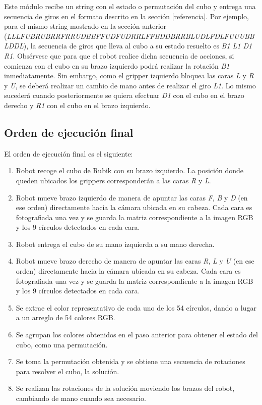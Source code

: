 Este módulo recibe un string con el estado o permutación del cubo y entrega una secuencia de giros en el formato descrito en la sección [referencia]. Por ejemplo, para el mismo string mostrado en la sección anterior (\textit{LLLFUBRUBRRFRRUDBBFFUDFUDRRLFFBDDBRRBLUDLFDLFUUUBBLDDL}), la secuencia de giros que lleva al cubo a su estado resuelto es \textit{B1 L1 D1 R1}. Obsérvese que para que el robot realice dicha secuencia de acciones, si comienza con el cubo en su brazo izquierdo podrá realizar la rotación \textit{B1} inmediatamente. Sin embargo, como el gripper izquierdo bloquea las caras \textit{L} y \textit{R} y \textit{U}, se deberá realizar un cambio de mano antes de realizar el giro \textit{L1}. Lo mismo sucederá cuando posteriormente se quiera efectuar \textit{D1} con el cubo en el brazo derecho y \textit{R1} con el cubo en el brazo izquierdo.


\subsection{Orden de ejecución final}
El orden de ejecución final es el siguiente:
\begin{enumerate}
	\item Robot recoge el cubo de Rubik con su brazo izquierdo. La posición donde queden ubicados los grippers corresponderán a las caras \textit{R} y \textit{L}.
	\item Robot mueve brazo izquierdo de manera de apuntar las caras \textit{F}, \textit{B} y \textit{D} (en ese orden) directamente hacia la cámara ubicada en su cabeza. Cada cara es fotografiada una vez y se guarda la matriz correspondiente a la imagen RGB y los 9 círculos detectados en cada cara.
	\item Robot entrega el cubo de su mano izquierda a su mano derecha.
	\item Robot mueve brazo derecho de manera de apuntar las caras \textit{R}, \textit{L} y \textit{U} (en ese orden) directamente hacia la cámara ubicada en su cabeza. Cada cara es fotografiada una vez y se guarda la matriz correspondiente a la imagen RGB y los 9 círculos detectados en cada cara.
	\item Se extrae el color representativo de cada uno de los 54 círculos, dando a lugar a un arreglo de 54 colores RGB.
	\item Se agrupan los colores obtenidos en el paso anterior para obtener el estado del cubo, como una permutación.
	\item Se toma la permutación obtenida y se obtiene una secuencia de rotaciones para resolver el cubo, la solución.
	\item Se realizan las rotaciones de la solución moviendo los brazos del robot, cambiando de mano cuando sea necesario.
\end{enumerate}
